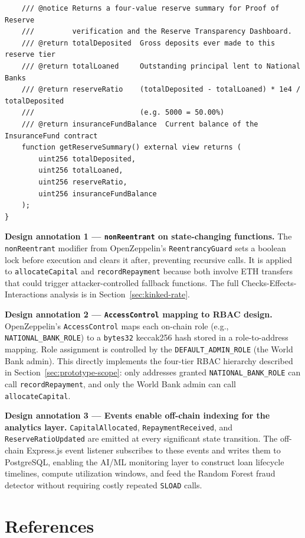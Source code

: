 \documentclass[12pt,a4paper]{report}
\begin{document}
\begin{lstlisting}
    /// @notice Returns a four-value reserve summary for Proof of Reserve
    ///         verification and the Reserve Transparency Dashboard.
    /// @return totalDeposited  Gross deposits ever made to this reserve tier
    /// @return totalLoaned     Outstanding principal lent to National Banks
    /// @return reserveRatio    (totalDeposited - totalLoaned) * 1e4 / totalDeposited
    ///                         (e.g. 5000 = 50.00%)
    /// @return insuranceFundBalance  Current balance of the InsuranceFund contract
    function getReserveSummary() external view returns (
        uint256 totalDeposited,
        uint256 totalLoaned,
        uint256 reserveRatio,
        uint256 insuranceFundBalance
    );
}
\end{lstlisting}

\textbf{Design annotation 1 --- \texttt{nonReentrant} on state-changing functions.}
The \texttt{nonReentrant} modifier from OpenZeppelin's \texttt{ReentrancyGuard} sets a boolean lock before execution and clears it after, preventing recursive calls. It is applied to \texttt{allocateCapital} and \texttt{recordRepayment} because both involve ETH transfers that could trigger attacker-controlled fallback functions. The full Checks-Effects-Interactions analysis is in Section~\ref{sec:kinked-rate}.

\textbf{Design annotation 2 --- \texttt{AccessControl} mapping to RBAC design.}
OpenZeppelin's \texttt{AccessControl} maps each on-chain role (e.g., \texttt{NATIONAL\_BANK\_ROLE}) to a \texttt{bytes32} keccak256 hash stored in a role-to-address mapping. Role assignment is controlled by the \texttt{DEFAULT\_ADMIN\_ROLE} (the World Bank admin). This directly implements the four-tier RBAC hierarchy described in Section~\ref{sec:prototype-scope}: only addresses granted \texttt{NATIONAL\_BANK\_ROLE} can call \texttt{recordRepayment}, and only the World Bank admin can call \texttt{allocateCapital}.

\textbf{Design annotation 3 --- Events enable off-chain indexing for the analytics layer.}
\texttt{CapitalAllocated}, \texttt{RepaymentReceived}, and \texttt{ReserveRatioUpdated} are emitted at every significant state transition. The off-chain Express.js event listener subscribes to these events and writes them to PostgreSQL, enabling the AI/ML monitoring layer to construct loan lifecycle timelines, compute utilization windows, and feed the Random Forest fraud detector without requiring costly repeated \texttt{SLOAD} calls.

\chapter*{References}
{}
\end{document}
